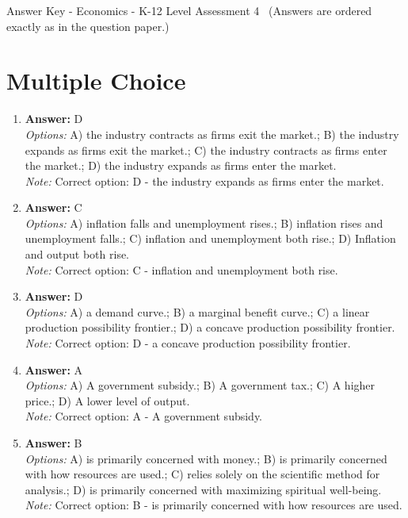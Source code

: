 \documentclass[12pt]{article}
\begin{document}
\begin{center}
Answer Key - Economics - K-12 Level Assessment 4 \
\small (Answers are ordered exactly as in the question paper.)
\end{center}

\section*{Multiple Choice}
\begin{enumerate}[label=\arabic*.]
\item \textbf{Answer:} D
\\ \textit{Options:} A) the industry contracts as firms exit the market.; B) the industry expands as firms exit the market.; C) the industry contracts as firms enter the market.; D) the industry expands as firms enter the market.
\\ \textit{Note:} Correct option: D - the industry expands as firms enter the market.
\item \textbf{Answer:} C
\\ \textit{Options:} A) inflation falls and unemployment rises.; B) inflation rises and unemployment falls.; C) inflation and unemployment both rise.; D) Inflation and output both rise.
\\ \textit{Note:} Correct option: C - inflation and unemployment both rise.
\item \textbf{Answer:} D
\\ \textit{Options:} A) a demand curve.; B) a marginal benefit curve.; C) a linear production possibility frontier.; D) a concave production possibility frontier.
\\ \textit{Note:} Correct option: D - a concave production possibility frontier.
\item \textbf{Answer:} A
\\ \textit{Options:} A) A government subsidy.; B) A government tax.; C) A higher price.; D) A lower level of output.
\\ \textit{Note:} Correct option: A - A government subsidy.
\item \textbf{Answer:} B
\\ \textit{Options:} A) is primarily concerned with money.; B) is primarily concerned with how resources are used.; C) relies solely on the scientific method for analysis.; D) is primarily concerned with maximizing spiritual well-being.
\\ \textit{Note:} Correct option: B - is primarily concerned with how resources are used.
\end{enumerate}
\end{document}
